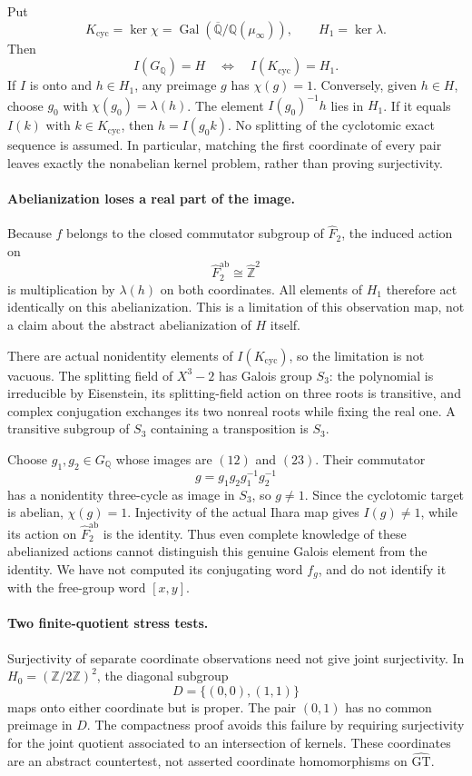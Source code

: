 \documentclass[11pt]{article}
\begin{document}
Put
\[
 K_{\mathrm{cyc}}=\ker\chi
  =\operatorname{Gal}(\overline{\mathbb Q}/\mathbb Q(\mu_\infty)),
 \qquad H_1=\ker\lambda.
\]
Then
\[
 I(G_{\mathbb Q})=H\quad\Longleftrightarrow\quad
 I(K_{\mathrm{cyc}})=H_1.
 \tag{91.4}
\]
If $I$ is onto and $h\in H_1$, any preimage $g$ has $\chi(g)=1$. Conversely, given $h\in H$, choose $g_0$ with $\chi(g_0)=\lambda(h)$. The element $I(g_0)^{-1}h$ lies in $H_1$. If it equals $I(k)$ with $k\in K_{\mathrm{cyc}}$, then $h=I(g_0k)$. No splitting of the cyclotomic exact sequence is assumed. In particular, matching the first coordinate of every pair leaves exactly the nonabelian kernel problem, rather than proving surjectivity.

\paragraph{Abelianization loses a real part of the image.}
Because $f$ belongs to the closed commutator subgroup of $\widehat F_2$, the induced action on
\[
 \widehat F_2^{\mathrm{ab}}\cong\widehat{\mathbb Z}^{2}
\]
is multiplication by $\lambda(h)$ on both coordinates. All elements of $H_1$ therefore act identically on this abelianization. This is a limitation of this observation map, not a claim about the abstract abelianization of $H$ itself.

There are actual nonidentity elements of $I(K_{\mathrm{cyc}})$, so the limitation is not vacuous. The splitting field of $X^3-2$ has Galois group $S_3$: the polynomial is irreducible by Eisenstein, its splitting-field action on three roots is transitive, and complex conjugation exchanges its two nonreal roots while fixing the real one. A transitive subgroup of $S_3$ containing a transposition is $S_3$.

Choose $g_1,g_2\in G_{\mathbb Q}$ whose images are $(12)$ and $(23)$. Their commutator
\[
 g=g_1g_2g_1^{-1}g_2^{-1}
\]
has a nonidentity three-cycle as image in $S_3$, so $g\ne1$. Since the cyclotomic target is abelian, $\chi(g)=1$. Injectivity of the actual Ihara map gives $I(g)\ne1$, while its action on $\widehat F_2^{\mathrm{ab}}$ is the identity. Thus even complete knowledge of these abelianized actions cannot distinguish this genuine Galois element from the identity. We have not computed its conjugating word $f_g$, and do not identify it with the free-group word $[x,y]$.

\paragraph{Two finite-quotient stress tests.}
Surjectivity of separate coordinate observations need not give joint surjectivity. In $H_0=(\mathbb Z/2\mathbb Z)^2$, the diagonal subgroup
\[
 D=\{(0,0),(1,1)\}
\]
maps onto either coordinate but is proper. The pair $(0,1)$ has no common preimage in $D$. The compactness proof avoids this failure by requiring surjectivity for the joint quotient associated to an intersection of kernels. These coordinates are an abstract countertest, not asserted coordinate homomorphisms on $\widehat{\mathrm{GT}}$.
\end{document}
